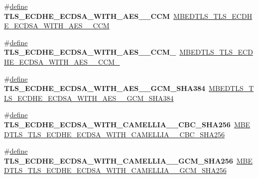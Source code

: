 \begin{DoxyCompactItemize}
\item 
\mbox{\label{compat-1_83_8h_a9d1ee1bea891d61cdad224755a2e0072}} 
\#\hyperlink{structdefine}{define} {\bfseries T\+L\+S\+\_\+\+E\+C\+D\+H\+E\+\_\+\+E\+C\+D\+S\+A\+\_\+\+W\+I\+T\+H\+\_\+\+A\+E\+S\+\_\+\_\+\+C\+CM}~\hyperlink{ssl__ciphersuites_8h_adb74f5656c7d83b40eaca016af88571d}{M\+B\+E\+D\+T\+L\+S\+\_\+\+T\+L\+S\+\_\+\+E\+C\+D\+H\+E\+\_\+\+E\+C\+D\+S\+A\+\_\+\+W\+I\+T\+H\+\_\+\+A\+E\+S\+\_\+\_\+\+C\+CM}
\item 
\mbox{\label{compat-1_83_8h_afd03144e2fea9b2ee57bd55564bc2ea7}} 
\#\hyperlink{structdefine}{define} {\bfseries T\+L\+S\+\_\+\+E\+C\+D\+H\+E\+\_\+\+E\+C\+D\+S\+A\+\_\+\+W\+I\+T\+H\+\_\+\+A\+E\+S\+\_\+\_\+\+C\+C\+M\+\_}~\hyperlink{ssl__ciphersuites_8h_aada6a719705315d2d69212693aecf34b}{M\+B\+E\+D\+T\+L\+S\+\_\+\+T\+L\+S\+\_\+\+E\+C\+D\+H\+E\+\_\+\+E\+C\+D\+S\+A\+\_\+\+W\+I\+T\+H\+\_\+\+A\+E\+S\+\_\+\_\+\+C\+C\+M\+\_}
\item 
\mbox{\label{compat-1_83_8h_af72ed33cfc1e9977b62253dae53923e2}} 
\#\hyperlink{structdefine}{define} {\bfseries T\+L\+S\+\_\+\+E\+C\+D\+H\+E\+\_\+\+E\+C\+D\+S\+A\+\_\+\+W\+I\+T\+H\+\_\+\+A\+E\+S\+\_\+\_\+\+G\+C\+M\+\_\+\+S\+H\+A384}~\hyperlink{ssl__ciphersuites_8h_a623797e4c376e49eee56ea5529b11c02}{M\+B\+E\+D\+T\+L\+S\+\_\+\+T\+L\+S\+\_\+\+E\+C\+D\+H\+E\+\_\+\+E\+C\+D\+S\+A\+\_\+\+W\+I\+T\+H\+\_\+\+A\+E\+S\+\_\+\_\+\+G\+C\+M\+\_\+\+S\+H\+A384}
\item 
\mbox{\label{compat-1_83_8h_a31ffae6edf6bd5396c78a58695f9d1b7}} 
\#\hyperlink{structdefine}{define} {\bfseries T\+L\+S\+\_\+\+E\+C\+D\+H\+E\+\_\+\+E\+C\+D\+S\+A\+\_\+\+W\+I\+T\+H\+\_\+\+C\+A\+M\+E\+L\+L\+I\+A\+\_\+\_\+\+C\+B\+C\+\_\+\+S\+H\+A256}~\hyperlink{ssl__ciphersuites_8h_a894e337cba52e16fea71c59b9dfc337d}{M\+B\+E\+D\+T\+L\+S\+\_\+\+T\+L\+S\+\_\+\+E\+C\+D\+H\+E\+\_\+\+E\+C\+D\+S\+A\+\_\+\+W\+I\+T\+H\+\_\+\+C\+A\+M\+E\+L\+L\+I\+A\+\_\+\_\+\+C\+B\+C\+\_\+\+S\+H\+A256}
\item 
\mbox{\label{compat-1_83_8h_a67cc77b084d7ab2fc9e5fe1de2426eea}} 
\#\hyperlink{structdefine}{define} {\bfseries T\+L\+S\+\_\+\+E\+C\+D\+H\+E\+\_\+\+E\+C\+D\+S\+A\+\_\+\+W\+I\+T\+H\+\_\+\+C\+A\+M\+E\+L\+L\+I\+A\+\_\+\_\+\+G\+C\+M\+\_\+\+S\+H\+A256}~\hyperlink{ssl__ciphersuites_8h_a8b4884d7e7c4583adeeee578d6ea3551}{M\+B\+E\+D\+T\+L\+S\+\_\+\+T\+L\+S\+\_\+\+E\+C\+D\+H\+E\+\_\+\+E\+C\+D\+S\+A\+\_\+\+W\+I\+T\+H\+\_\+\+C\+A\+M\+E\+L\+L\+I\+A\+\_\+\_\+\+G\+C\+M\+\_\+\+S\+H\+A256}

\end{DoxyCompactItemize}
